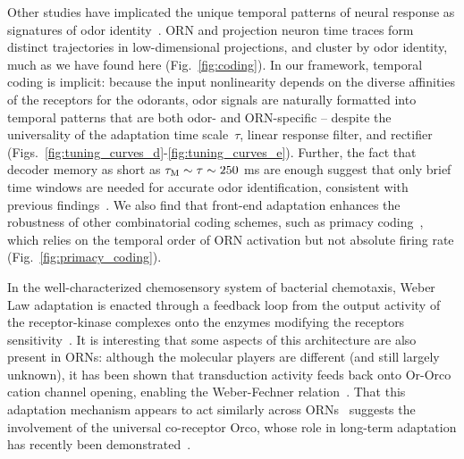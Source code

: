 \documentclass[9pt,twocolumn,twoside]{pnas-new}
\begin{document}
Other studies have implicated the unique temporal patterns of neural response as signatures of odor identity~\cite{stopfer_temporal_model, multiple_timescales_stopfer, stopfer_nat_neuro, stopfer_temporal_channel}. ORN and projection neuron time traces form distinct trajectories in low-dimensional projections, and cluster by odor identity, much as we have found here (Fig.~\ref{fig:coding}). In our framework, temporal coding is implicit: because the input nonlinearity depends on the diverse affinities of the receptors for the odorants, %
odor signals are naturally formatted into temporal patterns that are both odor- and ORN-specific --  despite the universality of the adaptation time scale~$\tau$, linear response filter, and rectifier (Figs.~\ref{fig:tuning_curves_d}-\ref{fig:tuning_curves_e}). Further, the fact that decoder memory as short as $\tau_{\textup M} \sim \tau \sim 250$ ms are enough suggest that only brief time windows are needed for accurate odor identification, consistent with previous findings~\cite{stopfer_nat_neuro}. We also find that front-end adaptation enhances the robustness of other combinatorial coding schemes, such as primacy coding~\cite{primacy_coding}, which relies on the temporal order of ORN activation but not absolute firing rate (Fig.~\ref{fig:primacy_coding}).

In the well-characterized chemosensory system of bacterial chemotaxis, Weber Law adaptation is enacted through a feedback loop from the output activity of the receptor-kinase complexes onto the enzymes modifying the receptors sensitivity~\cite{EmonetReview}. It is interesting that some aspects of this architecture are also present in ORNs: although the molecular players are different (and still largely unknown), it has been shown that transduction activity feeds back onto Or-Orco cation channel opening, enabling the Weber-Fechner relation~\cite{nagel_wilson_biophysical,srinivas_elife,cao_WL}. 
That this adaptation mechanism appears to act similarly across ORNs~\cite{srinivas_elife,martelli,cao_WL} suggests the involvement of the universal co-receptor Orco, whose role in long-term adaptation has recently been demonstrated~\cite{getahun2013insect,getahun2016intracellular,Guo_Smith}.  
\end{document}
